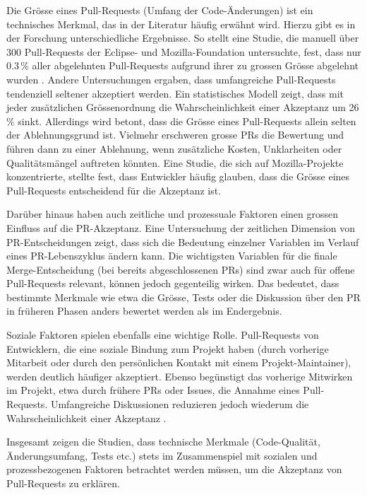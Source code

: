 Die Grösse eines Pull-Requests (Umfang der Code-Änderungen) ist ein technisches Merkmal, das in der Literatur häufig erwähnt wird. Hierzu gibt es in der Forschung unterschiedliche Ergebnisse. So stellt eine Studie, die manuell über 300 Pull-Requests der Eclipse- und Mozilla-Foundation untersuchte, fest, dass nur 0.3\,\% aller abgelehnten Pull-Requests aufgrund ihrer zu grossen Grösse abgelehnt wurden \parencite{tao_writing_2014}. Andere Untersuchungen ergaben, dass umfangreiche Pull-Requests tendenziell seltener akzeptiert werden. Ein statistisches Modell zeigt, dass mit jeder zusätzlichen Grössenordnung die Wahrscheinlichkeit einer Akzeptanz um 26\,\% sinkt. Allerdings wird betont, dass die Grösse eines Pull-Re\-quests allein selten der Ablehnungsgrund ist. Vielmehr erschweren grosse PRs die Bewertung und führen dann zu einer Ablehnung, wenn zusätzliche Kosten, Unklarheiten oder Qualitätsmängel auftreten könnten. Eine Studie, die sich auf Mozilla-Projekte konzentrierte, stellte fest, dass Entwickler häufig glauben, dass die Grösse eines Pull-Requests entscheidend für die Akzeptanz ist. \parencite{tsay_influence_2014}

Darüber hinaus haben auch zeitliche und prozessuale Faktoren einen grossen Einfluss auf die PR-Akzeptanz. Eine Untersuchung der zeitlichen Dimension von PR-Entscheidungen zeigt, dass sich die Bedeutung einzelner Variablen im Verlauf eines PR-Lebenszyklus ändern kann. Die wichtigsten Variablen für die finale Merge-Entscheidung (bei bereits abgeschlossenen PRs) sind zwar auch für offene Pull-\linebreak Requests relevant, können jedoch gegenteilig wirken. Das bedeutet, dass bestimmte Merkmale wie etwa die Grösse, Tests oder die Diskussion über den PR in früheren Phasen anders bewertet werden als im Endergebnis. \parencite{west_temporal_2023}

Soziale Faktoren spielen ebenfalls eine wichtige Rolle. Pull-Requests von Entwicklern, die eine soziale Bindung zum Projekt haben (durch vorherige Mitarbeit oder durch den persönlichen Kontakt mit einem Projekt-Maintainer), werden deutlich häufiger akzeptiert. Ebenso begünstigt das vorherige Mitwirken im Projekt, etwa durch frühere PRs oder Issues, die Annahme eines Pull-Requests. Umfangreiche Diskussionen reduzieren jedoch wiederum die Wahrscheinlichkeit einer Akzeptanz \parencite{tsay_influence_2014}.

Insgesamt zeigen die Studien, dass technische Merkmale (Code-Qualität, Änderungsumfang, Tests etc.) stets im Zusammenspiel mit sozialen und prozessbezogenen Faktoren betrachtet werden müssen, um die Akzeptanz von Pull-Requests zu erklären.

